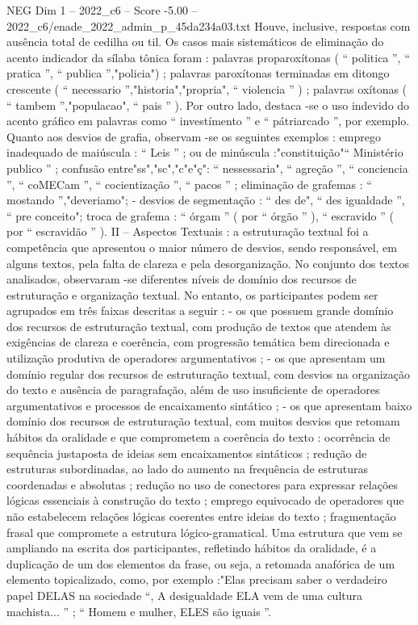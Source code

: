 \begin{textsample}{NEG Dim 1 – 2022\_c6 – Score -5.00 – 2022\_c6/enade\_2022\_admin\_p\_45da234a03.txt}
Houve, inclusive, respostas com ausência total de cedilha ou til.
Os casos mais sistemáticos de eliminação do acento indicador da sílaba tônica foram : palavras proparoxítonas ( “ politica ”, “ pratica ”, “ publica ”,"policia") ; palavras paroxítonas terminadas em ditongo crescente ( “ necessario ”,"historia","propria", “ violencia ” ) ; palavras oxítonas ( “ tambem ”,"populacao", “ pais ” ).
Por outro lado, destaca -se o uso indevido do acento gráfico em palavras como “ investímento ” e “ pátriarcado ”, por exemplo.
Quanto aos desvios de grafia, observam -se os seguintes exemplos : emprego inadequado de maiúscula : “ Leis ” ; ou de minúscula :"constituição"“ Ministério publico ” ; confusão entre"ss","sc","c"e"ç": “ nessessaria", “ agreção ”, “ conciencia ”, “ coMECam ”, “ cocientização ”, “ pacos ” ; eliminação de grafemas : “ mostando ”,"deveriamo"; - desvios de segmentação : “ des de", “ des igualdade ”, “ pre conceito"; troca de grafema : “ órgam ” ( por “ órgão ” ), “ escravido ” ( por “ escravidão ” ).
II – Aspectos Textuais : a estruturação textual foi a competência que apresentou o maior número de desvios, sendo responsável, em alguns textos, pela falta de clareza e pela desorganização.
No conjunto dos textos analisados, observaram -se diferentes níveis de domínio dos recursos de estruturação e organização textual.
No entanto, os participantes podem ser agrupados em três faixas descritas a seguir : - os que possuem grande domínio dos recursos de estruturação textual, com produção de textos que atendem às exigências de clareza e coerência, com progressão temática bem direcionada e utilização produtiva de operadores argumentativos ; - os que apresentam um domínio regular dos recursos de estruturação textual, com desvios na organização do texto e ausência de paragrafação, além de uso insuficiente de operadores argumentativos e processos de encaixamento sintático ; - os que apresentam baixo domínio dos recursos de estruturação textual, com muitos desvios que retomam hábitos da oralidade e que comprometem a coerência do texto : ocorrência de sequência justaposta de ideias sem encaixamentos sintáticos ; redução de estruturas subordinadas, ao lado do aumento na frequência de estruturas coordenadas e absolutas ; redução no uso de conectores para expressar relações lógicas essenciais à construção do texto ; emprego equivocado de operadores que não estabelecem relações lógicas coerentes entre ideias do texto ; fragmentação frasal que compromete a estrutura lógico-gramatical.
Uma estrutura que vem se ampliando na escrita dos participantes, refletindo hábitos da oralidade, é a duplicação de um dos elementos da frase, ou seja, a retomada anafórica de um elemento topicalizado, como, por exemplo :"Elas precisam saber o verdadeiro papel DELAS na sociedade “, A desigualdade ELA vem de uma cultura machista... ” ; “ Homem e mulher, ELES são iguais ”.

\end{textsample}
